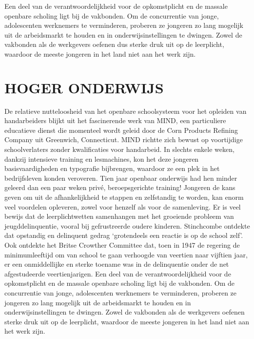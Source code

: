 \documentclass[
  a5paper,
  smalldemyvopaper,10pt,twoside,onecolumn,openright,extrafontsizes,hidelinks]{memoir}
\begin{document}
Een deel van de verantwoordelijkheid voor de opkomstplicht en de massale
openbare scholing ligt bij de vakbonden. Om de concurrentie van jonge,
adolescenten werknemers te verminderen, proberen ze jongeren zo lang
mogelijk uit de arbeidsmarkt te houden en in onderwijsinstellingen te
dwingen. Zowel de vakbonden als de werkgevers oefenen dus sterke druk
uit op de leerplicht, waardoor de meeste jongeren in het land niet aan
het werk zijn.

\section{HOGER ONDERWIJS}\label{hoger-onderwijs}

De relatieve nutteloosheid van het openbare schoolsysteem voor het
opleiden van handarbeiders blijkt uit het fascinerende werk van MIND,
een particuliere educatieve dienst die momenteel wordt geleid door de
Corn Products Refining Company uit Greenwich, Connecticut. MIND richtte
zich bewust op voortijdige schoolverlaters zonder kwalificaties voor
handarbeid. In slechts enkele weken, dankzij intensieve training en
lesmachines, kon het deze jongeren basisvaardigheden en typografie
bijbrengen, waardoor ze een plek in het bedrijfsleven konden veroveren.
Tien jaar openbaar onderwijs had hen minder geleerd dan een paar weken
privé, beroepsgerichte training! Jongeren de kans geven om uit de
afhankelijkheid te stappen en zelfstandig te worden, kan enorm veel
voordelen opleveren, zowel voor henzelf als voor de samenleving. Er is
veel bewijs dat de leerplichtwetten samenhangen met het groeiende
probleem van jeugddelinquentie, vooral bij gefrustreerde oudere
kinderen. Stinchcombe ontdekte dat opstandig en delinquent gedrag
`grotendeels een reactie is op de school zelf'. Ook ontdekte het Britse
Crowther Committee dat, toen in 1947 de regering de minimumleeftijd om
van school te gaan verhoogde van veertien naar vijftien jaar, er een
onmiddellijke en sterke toename was in de delinquentie onder de net
afgestudeerde veertienjarigen. Een deel van de verantwoordelijkheid voor
de opkomstplicht en de massale openbare scholing ligt bij de vakbonden.
Om de concurrentie van jonge, adolescenten werknemers te verminderen,
proberen ze jongeren zo lang mogelijk uit de arbeidsmarkt te houden en
in onderwijsinstellingen te dwingen. Zowel de vakbonden als de
werkgevers oefenen sterke druk uit op de leerplicht, waardoor de meeste
jongeren in het land niet aan het werk zijn.
\end{document}
